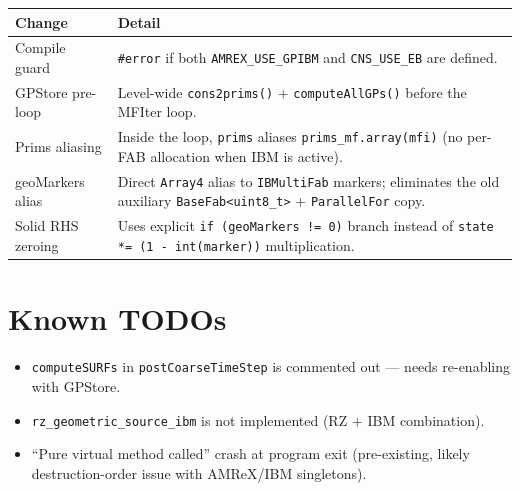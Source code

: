 \documentclass[11pt,a4paper]{article}
\begin{document}
\begin{longtable}{p{4.5cm} p{9cm}}
\toprule
\textbf{Change} & \textbf{Detail} \\
\midrule
Compile guard
  & \texttt{\#error} if both \texttt{AMREX\_USE\_GPIBM} and
    \texttt{CNS\_USE\_EB} are defined. \\

GPStore pre-loop
  & Level-wide \texttt{cons2prims()} + \texttt{computeAllGPs()} before
    the MFIter loop. \\

Prims aliasing
  & Inside the loop, \texttt{prims} aliases \texttt{prims\_mf.array(mfi)}
    (no per-FAB allocation when IBM is active). \\

geoMarkers alias
  & Direct \texttt{Array4} alias to \texttt{IBMultiFab} markers;
    eliminates the old auxiliary \texttt{BaseFab<uint8\_t>} +
    \texttt{ParallelFor} copy. \\

Solid RHS zeroing
  & Uses explicit \texttt{if (geoMarkers != 0)} branch instead of
    \texttt{state *= (1 - int(marker))} multiplication. \\
\bottomrule
\end{longtable}

\section{Known TODOs}

\begin{itemize}
  \item \texttt{computeSURFs} in \texttt{postCoarseTimeStep} is commented
        out --- needs re-enabling with GPStore.
  \item \texttt{rz\_geometric\_source\_ibm} is not implemented
        (RZ + IBM combination).
  \item ``Pure virtual method called'' crash at program exit (pre-existing,
        likely destruction-order issue with AMReX/IBM singletons).
\end{itemize}
\end{document}
